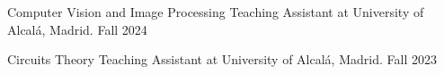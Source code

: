 


\begin{cvhonors}

  \cvhonor
    {Computer Vision and Image Processing} %
    {Teaching Assistant at University of Alcalá, Madrid.} %
    {} %
    {Fall 2024} %

  \cvhonor
    {Circuits Theory} %
    {Teaching Assistant at University of Alcalá, Madrid.} %
    {} %
    {Fall 2023} %

\end{cvhonors}
